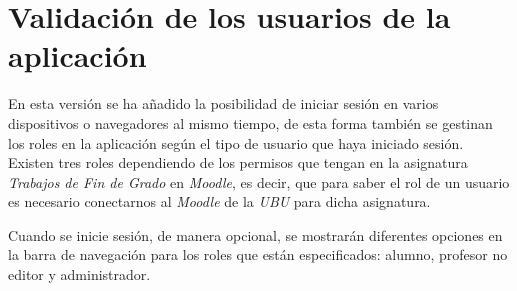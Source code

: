 \section{Validación de los usuarios de la aplicación}

En esta versión se ha añadido la posibilidad de iniciar sesión en varios dispositivos o navegadores al mismo tiempo, de esta forma también se gestinan los roles en la aplicación según el tipo de usuario que haya iniciado sesión. Existen tres roles dependiendo de los permisos que tengan en la asignatura \emph{Trabajos de Fin de Grado} en \emph{Moodle}, es decir, que para saber el rol de un usuario es necesario conectarnos al \emph{Moodle} de la \emph{UBU} para dicha asignatura.

Cuando se inicie sesión, de manera opcional, se mostrarán diferentes opciones en la barra de navegación para los roles que están especificados: alumno, profesor no editor y administrador.